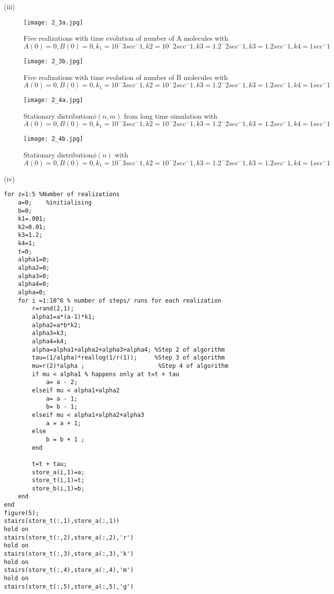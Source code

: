 \documentclass[10 pt]{article}
\begin{document}
\begin{multicols}{2}
\begin{flushleft}
(iii)\begin{figure}[H]
\centerline{\texttt{[image: 2\_3a.jpg]}}
\caption{Five realizations with time evolution of number of A molecules with $A(0)=0, B(0)=0, k_1=10^-3 sec^-1, k2=10^-2 sec^-1, k3=1.2^-2 sec^-1, k3=1.2 sec^-1, k4=1 sec^-1 $}
\end{figure}
\begin{figure}[H]
\centerline{\texttt{[image: 2\_3b.jpg]}}
\caption{Five realizations with time evolution of number of B molecules with $A(0)=0, B(0)=0, k_1=10^-3 sec^-1, k2=10^-2 sec^-1, k3=1.2^-2 sec^-1, k3=1.2 sec^-1, k4=1 sec^-1 $}
\end{figure}
\begin{figure}[H]\label{5}
\texttt{[image: 2\_4a.jpg]}
\caption{Stationary distribution$\phi(n,m)$ from long time simulation with $A(0)=0, B(0)=0, k_1=10^-3 sec^-1, k2=10^-2 sec^-1, k3=1.2^-2 sec^-1, k3=1.2 sec^-1, k4=1 sec^-1 $}
\end{figure}
\begin{figure}[H]\label{6}
\centerline{\texttt{[image: 2\_4b.jpg]}}
\caption{Stationary distribution$\phi(n)$ with $A(0)=0, B(0)=0, k_1=10^-3 sec^-1, k2=10^-2 sec^-1, k3=1.2^-2 sec^-1, k3=1.2 sec^-1, k4=1 sec^-1 $}
\end{figure}
(iv)
\begin{lstlisting}
for z=1:5 %Number of realizations
    a=0;	%initialising 
    b=0;
    k1=.001;
    k2=0.01;
    k3=1.2;
    k4=1;
    t=0;
    alpha1=0;
    alpha2=0;
    alpha3=0;
    alpha4=0;
    alpha=0;
    for i =1:10^6 % number of steps/ runs for each realization
        r=rand(2,1);        
        alpha1=a*(a-1)*k1;
        alpha2=a*b*k2;
        alpha3=k3;
        alpha4=k4;
        alpha=alpha1+alpha2+alpha3+alpha4; %Step 2 of algorithm
        tau=(1/alpha)*reallog(1/r(1));	   %Step 3 of algorithm
        mu=r(2)*alpha ;						%Step 4 of algorithm
        if mu < alpha1 % happens only at t=t + tau
            a= a - 2;
        elseif mu < alpha1+alpha2
            a= a - 1;
            b= b - 1;
        elseif mu < alpha1+alpha2+alpha3
            a = a + 1;
        else
            b = b + 1 ;        
        end
        
        t=t + tau;
        store_a(i,1)=a;
        store_t(i,1)=t;
        store_b(i,1)=b;
    end      
end
figure(5);
stairs(store_t(:,1),store_a(:,1))
hold on
stairs(store_t(:,2),store_a(:,2),'r')
hold on
stairs(store_t(:,3),store_a(:,3),'k')
hold on
stairs(store_t(:,4),store_a(:,4),'m')
hold on
stairs(store_t(:,5),store_a(:,5),'g')


\end{lstlisting}
\end{flushleft}
\end{multicols}
\end{document}
